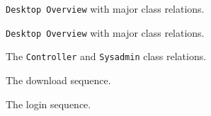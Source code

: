 
\begin{figure}[H]
\caption{\texttt{Desktop Overview} with major class relations.}
\label{fig:des_overview}
\end{figure}

\begin{figure}[H]
\caption{\texttt{Desktop Overview} with major class relations.}
\label{fig:des_overview2}
\end{figure}


\begin{figure}[H]
\caption{The \texttt{Controller} and \texttt{Sysadmin} class relations.}
\label{fig:des_sysadmin}
\end{figure}


\begin{figure}[H]
\caption{The download sequence.}
\label{fig:des_sequence_download}
\end{figure}

\begin{figure}[H]
\caption{The login sequence.}
\label{fig:des_sequence_login}
\end{figure}
